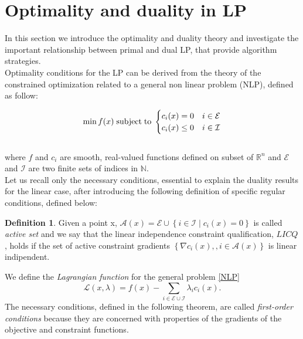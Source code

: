 \documentclass[a4paper,10 pt,titlepage,twoside]{book}
\theoremstyle{plain}
\theoremstyle{definition}
\newtheorem{defn}[thm]{Definition}
\newtheorem{ex}[thm]{Example}
\theoremstyle{remark}
\begin{document}

\section{Optimality and duality in LP}
In this section we introduce the optimality and duality theory and investigate the important relationship between primal and dual LP, that provide algorithm strategies.\\ 
Optimality conditions for the LP can be derived from the theory of the constrained optimization related to a general non linear problem (NLP), defined as follow:

\begin{equation}\label{NLP}
\min f(x)\text{\;subject\;to\;}\begin{cases} c_{i}(x) = 0 &i \in \mathcal{E}\\ c_{i}(x)\leq 0 &i\in \mathcal{I}\end{cases}
\end{equation}
\\
where $f$ and $c_{i}$ are smooth, real-valued functions defined on subset of $\mathbb{R}^{n}$ and $\mathcal{E}$ and $\mathcal{I}$ are two finite sets of indices in $\mathbb{N}$.\\Let us recall only the necessary conditions, essential to explain the duality results for the linear case, after introducing the following definition of specific regular conditions, defined below:
\begin{defn}
	Given a point x, $\mathcal{A}(x)= \mathcal{E}\cup\left\lbrace i\in\mathcal{I}\;|\;c_{i}(x) =0\right\rbrace$ is called \textit{active set} and we say that the linear independence constraint qualification, $LICQ$, holds if the set of active constraint gradients $\left\lbrace \nabla c_{i}(x),,i\in\mathcal{A}(x)\right\rbrace$ is linear indipendent.
\end{defn}
We define the \textit{Lagrangian function} for the general problem \ref{NLP} 
\begin{equation*}
\mathcal{L}\left(x,\lambda\right)=f(x)-\sum_{i\in\mathcal{E}\cup\mathcal{I}}\lambda_{i}c_{i}(x).
\end{equation*}
The necessary conditions, defined in the following theorem, are called \textit{first-order conditions} because they are concerned with properties of the gradients of the objective and constraint functions.
\end{document}
